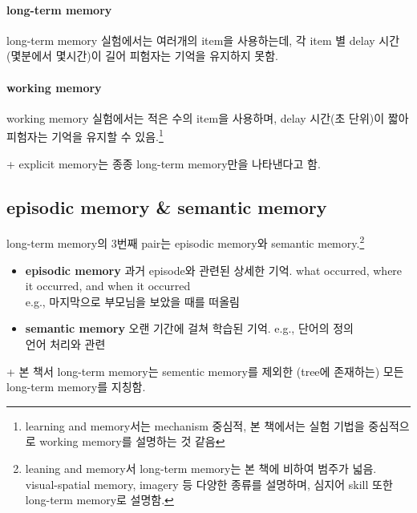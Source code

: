 \documentclass[../note.tex]{subfiles}
\begin{document}
\paragraph{long-term memory}
long-term memory 실험에서는 여러개의 item을 사용하는데, 각 item 별 delay 시간(몇분에서 몇시간)이 길어 피험자는 기억을 유지하지 못함.

\paragraph{working memory}
working memory 실험에서는 적은 수의 item을 사용하며, delay 시간(초 단위)이 짧아 피험자는 기억을 유지할 수 있음.\footnote{learning and memory서는 mechanism 중심적, 본 책에서는 실험 기법을 중심적으로 working memory를 설명하는 것 같음}

+ explicit memory는 종종 long-term memory만을 나타낸다고 함.

\subsection{episodic memory \& semantic memory}
long-term memory의 3번째 pair는 episodic memory와 semantic memory.\footnote{leaning and memory서 long-term memory는 본 책에 비하여 범주가 넓음. visual-spatial memory, imagery 등 다양한 종류를 설명하며, 심지어 skill 또한 long-term memory로 설명함.}

\begin{itemize}
  \item{\textbf{episodic memory}}
    과거 episode와 관련된 상세한 기억. what occurred, where it occurred, and when it occurred\\
    e.g., 마지막으로 부모님을 보았을 때를 떠올림
  \item{\textbf{semantic memory}}
    오랜 기간에 걸쳐 학습된 기억. e.g., 단어의 정의\\
    언어 처리와 관련
\end{itemize}

+ 본 책서 long-term memory는 sementic memory를 제외한 (tree에 존재하는) 모든 long-term memory를 지칭함.
\end{document}

